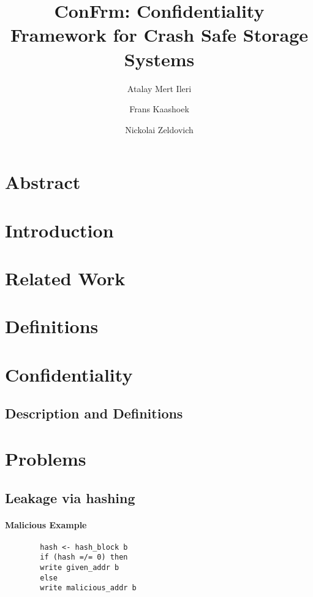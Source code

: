 \documentclass[onecolumn]{paper}
\title{ConFrm: Confidentiality Framework for Crash Safe Storage Systems}
\author{Atalay Mert Ileri \and Frans Kaashoek \and Nickolai Zeldovich}
\begin{document}
\maketitle

\section{Abstract}

\section{Introduction}

\section{Related Work}

\section {Definitions}

\section{Confidentiality}
	\subsection{Description and Definitions}

\section{Problems}
        \subsection{Leakage via hashing}


	\paragraph*{Malicious Example}
	\begin{verbatim}
		hash <- hash_block b
		if (hash =/= 0) then
		write given_addr b
		else
		write malicious_addr b
	\end{verbatim}
\end{document}
